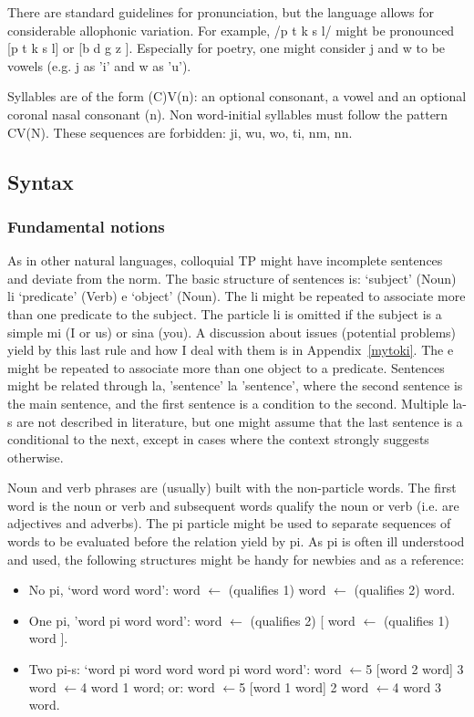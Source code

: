 \documentclass{article}
\begin{document}
There are standard guidelines for pronunciation,
but the language allows for considerable allophonic
variation.
For example, /p t k s l/ might be pronounced
[p t k s l] or [b d g z ].
Especially for poetry, one might consider
j and w to be vowels
(e.g. j as 'i' and w as 'u').

Syllables are of the form (C)V(n):
an optional consonant, a vowel and an optional coronal nasal consonant
(n).
Non word-initial syllables must follow the pattern CV(N).
These sequences are forbidden: ji, wu, wo, ti, nm, nn.

\subsection{Syntax}\label{syntax}
\subsubsection{Fundamental notions}
As in other natural languages, 
colloquial TP might have
incomplete sentences and deviate from the
norm.
The basic structure of sentences is:
`subject' (Noun) li `predicate' (Verb) e `object' (Noun).
The li might be repeated to associate more than
one predicate to the subject.
The particle li is omitted if the subject is a simple mi (I or us)
or sina (you). A discussion about issues (potential problems)
yield by this last rule
and how I deal with them is in Appendix~\ref{mytoki}.
The e might be repeated to associate more than
one object to a predicate.
Sentences might be related through la,
'sentence' la 'sentence', where the second sentence is
the main sentence, and the first sentence is a condition
to the second.
Multiple la-s are not described in literature,
but one might assume that the last sentence
is a conditional to the next,
except in cases where the context strongly suggests
otherwise.

Noun and verb phrases are (usually) built with the non-particle words.
The first word is the noun or verb and subsequent words
qualify the noun or verb (i.e. are adjectives and adverbs).
The pi particle might be used to separate sequences of words
to be evaluated before the relation yield by pi.
As pi is often ill understood and used,
the following structures might be handy for newbies and as a
reference:
\begin{itemize}
  \item No pi, `word word word':
word $\leftarrow$ (qualifies 1) word $\leftarrow$ (qualifies 2)  word.
  \item One pi, 'word pi word word': word $\leftarrow$ (qualifies 2) [
      word $\leftarrow$ (qualifies 1)  word ].
  \item Two pi-s: `word pi word word word pi word word':
    word $\leftarrow$5 [word 2 word] 3 word $\leftarrow$4 word 1  word;
or:
    word $\leftarrow$5 [word 1 word] 2 word $\leftarrow$4 word 3  word.
\end{itemize}
\end{document}
